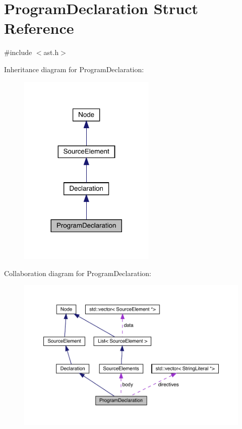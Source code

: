 \hypertarget{struct_program_declaration}{}\section{Program\+Declaration Struct Reference}
\label{struct_program_declaration}


{\ttfamily \#include $<$ast.\+h$>$}



Inheritance diagram for Program\+Declaration\+:\nopagebreak
\begin{figure}[H]
\begin{center}
\leavevmode
\includegraphics[width=185pt]{struct_program_declaration__inherit__graph}
\end{center}
\end{figure}


Collaboration diagram for Program\+Declaration\+:
\nopagebreak
\begin{figure}[H]
\begin{center}
\leavevmode
\includegraphics[width=350pt]{struct_program_declaration__coll__graph}
\end{center}
\end{figure}
